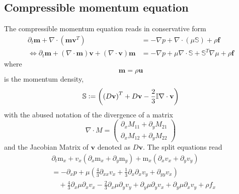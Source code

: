 \documentclass{article}
\begin{document}
\subsection{Compressible momentum equation}
\label{sub:Compressible momentum equation}
The compressible momentum equation reads in conservative form
\begin{equation}
  \label{eq:compressible NS}
  \begin{aligned}
    \partial_t \mathbf{m} + \nabla \cdot (\mathbf{m}\mathbf{v}^T)
    &= - \nabla p + \nabla \cdot (\mu\mathbb{S}) + \rho \mathbf{f} \\
    \Leftrightarrow\partial_t \mathbf{m} + (\nabla \cdot \mathbf{m})\mathbf{v} + (\nabla \cdot \mathbf{v})\mathbf{m}
    &= - \nabla p + \mu \nabla \cdot \mathbb{S} + \mathbb{S}^T \nabla\mu + \rho \mathbf{f}
  \end{aligned}
\end{equation}
where
\begin{equation}
  \mathbf{m} = \rho \mathbf{u}
\end{equation}
is the momentum density,
\begin{equation}
  \mathbb{S} \mathrel{\mathop:}= \left({(D\mathbf{v})}^T + D\mathbf{v} - \frac{2}{3}\mathbb{I}\nabla\cdot\mathbf{v} \right)
\end{equation}
with the abused notation of the divergence of a matrix
\begin{equation}
  \nabla \cdot M =
  \begin{pmatrix}
    \partial_x M_{11} + \partial_y M_{21} \\
    \partial_x M_{12} + \partial_y M_{22}
  \end{pmatrix}
\end{equation}
and the Jacobian Matrix of $\mathbf{v}$ denoted as $D\mathbf{v}$.
The split equations read
\begin{equation}
  \begin{aligned}
    & \partial_t \text{m}_x
    + v_x (\partial_x \text{m}_x + \partial_y \text{m}_y)
    + \text{m}_x (\partial_x v_x + \partial_y v_y)  \\
    & =
     - \partial_x p
     + \mu \left(\frac{4}{3}\partial_{xx}v_x
            + \frac{1}{3}\partial_x\partial_x v_y
            + \partial_{yy} v_x \right) \\
    &\quad + \frac{4}{3}\partial_x \mu \partial_x v_x
    - \frac{2}{3}\partial_x \mu \partial_y v_y
    + \partial_y \mu \partial_y v_x
    + \partial_y \mu \partial_x v_y
    + \rho f_x
  \end{aligned}
\end{equation}
\end{document}
